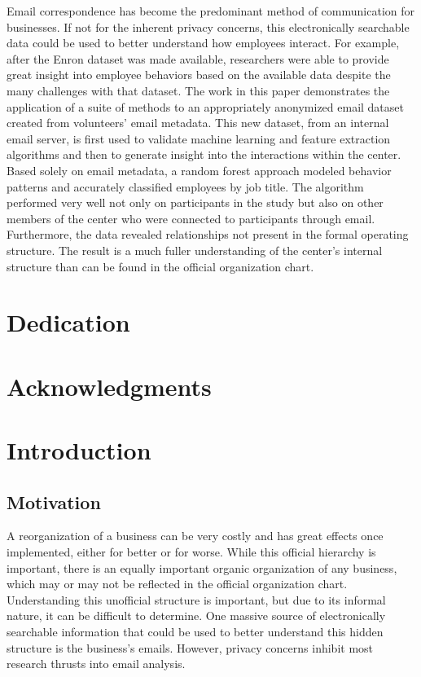 \documentclass[12pt]{report}
\begin{document}
Email correspondence has become the predominant method of communication for businesses.
If not for the inherent privacy concerns, this electronically searchable data could be used to better understand how employees interact. 
For example, after the Enron dataset was made available, researchers were able to provide great insight into employee behaviors based on the available data despite the many challenges with that dataset.  
The work in this paper demonstrates the application of a suite of methods to an appropriately anonymized email dataset created from volunteers' email metadata.  
This new dataset, from an internal email server, is first used to validate machine learning and feature extraction algorithms and then to generate insight into the interactions within the center.  
Based solely on email metadata, a random forest approach modeled behavior patterns and accurately classified employees by job title.  
The algorithm performed very well not only on participants in the study but also on other members of the center who were connected to participants through email. 
Furthermore, the data revealed relationships not present in the formal operating structure. 
The result is a much fuller understanding of the center's internal structure than can be found in the official organization chart.


\vfill



\pagebreak

\chapter*{Dedication}
\chapter*{Acknowledgments}

\tableofcontents
\pagebreak

\listoffigures
\pagebreak

\listoftables
\pagebreak

\pagestyle{myheadings}

\chapter{Introduction} \label{Introduction}
\section{Motivation}
A reorganization of a business can be very costly and has great effects once implemented, either for better or for worse.
While this official hierarchy is important, there is an equally important organic organization of any business, which may or may not be reflected in the official organization chart.
Understanding this unofficial structure is important, but due to its informal nature, it can be difficult to determine.
One massive source of electronically searchable information that could be used to better understand this hidden structure is the business's emails.
However, privacy concerns inhibit most research thrusts into email analysis.  
\end{document}
